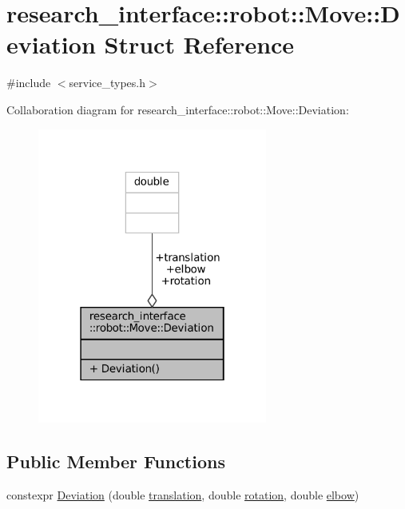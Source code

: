\hypertarget{structresearch__interface_1_1robot_1_1Move_1_1Deviation}{}\section{research\+\_\+interface\+:\+:robot\+:\+:Move\+:\+:Deviation Struct Reference}
\label{structresearch__interface_1_1robot_1_1Move_1_1Deviation}


{\ttfamily \#include $<$service\+\_\+types.\+h$>$}



Collaboration diagram for research\+\_\+interface\+:\+:robot\+:\+:Move\+:\+:Deviation\+:
\nopagebreak
\begin{figure}[H]
\begin{center}
\leavevmode
\includegraphics[width=214pt]{structresearch__interface_1_1robot_1_1Move_1_1Deviation__coll__graph}
\end{center}
\end{figure}
\subsection*{Public Member Functions}
\begin{DoxyCompactItemize}
\item 
constexpr \hyperlink{structresearch__interface_1_1robot_1_1Move_1_1Deviation_a22cbf93aef5b9c82995343d5c50bb5b8}{Deviation} (double \hyperlink{structresearch__interface_1_1robot_1_1Move_1_1Deviation_a6e931e7573151ebdc78bea671357c034}{translation}, double \hyperlink{structresearch__interface_1_1robot_1_1Move_1_1Deviation_a816c4e4265f821e02abe8e524312c8fe}{rotation}, double \hyperlink{structresearch__interface_1_1robot_1_1Move_1_1Deviation_af769b3fba182ec577c0b64fc1dedce72}{elbow})
\end{DoxyCompactItemize}
